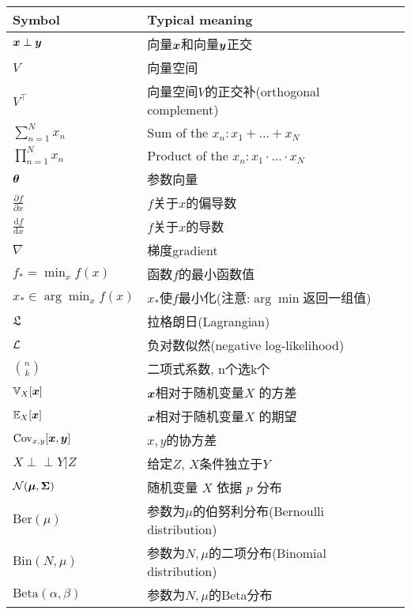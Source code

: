 \begin{table}
\begin{tabular}{llp{\textwidth}}
	\hline
	Symbol & Typical meaning \\
	\hline
	\hline
	$ \boldsymbol{x} \perp \boldsymbol{y} $ & 向量$\boldsymbol{x}$和向量$\boldsymbol{y}$正交 \\
	$V$ & 向量空间 \\
	$V^\top$ & 向量空间$V$的正交补(orthogonal complement) \\
	$\sum_{n=1}^{N}x_n$ & Sum of the $x_n: x_1 + ... + x_N$ \\
	$\prod_{n=1}^{N}x_n$ & Product of the $x_n: x_1 \cdot ... \cdot x_N$ \\
	$\boldsymbol{\theta}$ & 参数向量 \\
	$ \frac{\partial f}{\partial x} $ & $f$关于$x$的偏导数 \\
	$ \frac{\mathrm{d} f}{\mathrm{d} x} $ & $f$关于$x$的导数 \\
	$ \nabla $ & 梯度{gradient} \\
	$ f_* = \min_x f(x) $ & 函数$f$的最小函数值 \\
	$ x_* \in \arg \min_x f(x) $ & $x_*$使$f$最小化(注意:$\arg \min$返回一组值) \\
	$ \mathfrak{L}$ & 拉格朗日(Lagrangian) \\
	$ \mathcal{L}$ & 负对数似然(negative log-likelihood) \\
	$\binom{n}{k}$ & 二项式系数, n个选k个\\
	$\mathbb{V}_X[\boldsymbol{x}]$ & $\boldsymbol{x}$相对于随机变量$X$ 的方差 \\
	$\mathbb{E}_X[\boldsymbol{x}]$ & $\boldsymbol{x}$相对于随机变量$X$ 的期望 \\
	$\mathrm{Cov}_{x,y}[\boldsymbol{x}, \boldsymbol{y}]$ & $x,y$的协方差 \\
	$X \perp \!\!\! \perp Y | Z$ & 给定$Z$, $X$条件独立于$Y$ \\
	$\mathcal{N}(\boldsymbol{\mu}, \boldsymbol{\Sigma})$ & 随机变量 $X$ 依据 $p$ 分布 \\
	$\mathrm{Ber}(\mu)$ & 参数为$\mu$的伯努利分布(Bernoulli distribution) \\
	$\mathrm{Bin}(N, \mu)$ & 参数为$N, \mu$的二项分布(Binomial distribution) \\
	$\mathrm{Beta}(\alpha, \beta)$ & 参数为$N, \mu$的Beta分布 \\
	\hline
\end{tabular}
\end{table}

